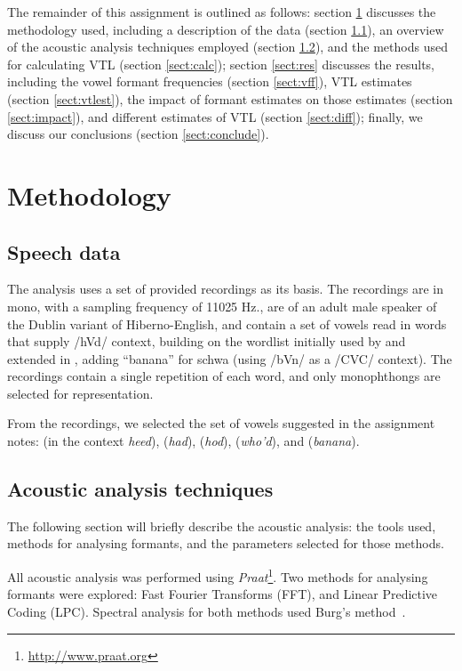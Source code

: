 \documentclass[11pt]{article}
\begin{document}
The remainder of this assignment is outlined as follows:
section \ref{sect:meth} discusses the methodology used, including a description of the data (section \ref{sect:data}), an overview of the acoustic analysis techniques employed (section \ref{sect:tech}), and the methods used for calculating VTL (section \ref{sect:calc}); section \ref{sect:res} discusses the results, including the vowel formant frequencies (section \ref{sect:vff}), VTL estimates (section \ref{sect:vtlest}), the impact of formant estimates on those estimates (section \ref{sect:impact}), and different estimates of VTL (section \ref{sect:diff}); finally, we discuss our conclusions (section \ref{sect:conclude}).


\section{Methodology}
\label{sect:meth}
\subsection{Speech data}
\label{sect:data}

The analysis uses a set of provided recordings as its basis.
The recordings are in mono, with a sampling frequency of 11025 Hz., are of an adult male speaker of the Dublin variant of Hiberno-English, and contain a set of vowels read in words that supply /hVd/ context, building on the wordlist initially used by \citet[p. 175]{peterson1952control} and extended in \citet[p. 38]{ladefoged2010course}, adding ``banana'' for schwa (using /bVn/ as a /CVC/ context). The recordings contain a single repetition of each word, and only monophthongs are selected for representation. 

From the recordings, we selected the set of vowels suggested in the assignment notes:  (in the context \textit{heed}),  (\textit{had}),  (\textit{hod}),  (\textit{who'd}), and  (\textit{banana}).

\subsection{Acoustic analysis techniques}
\label{sect:tech}

The following section will briefly describe the acoustic analysis: the tools used, methods for analysing formants, and the parameters selected for those methods.

All acoustic analysis was performed using \textit{Praat}\footnote{\url{http://www.praat.org}}. Two methods for analysing formants were explored: Fast Fourier Transforms (FFT), and Linear Predictive Coding (LPC). Spectral analysis for both methods used Burg's method~\citep{burg1975maxent}.
\end{document}
